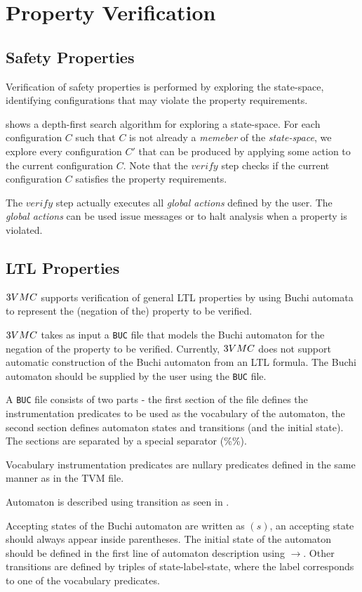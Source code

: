 \section{Property Verification}

\subsection{Safety Properties}

Verification of safety properties is performed by exploring the
state-space, identifying configurations that may violate the
property requirements.

 shows a depth-first search algorithm for
exploring a state-space. For each configuration $C$ such that $C$
is not already a \emph{memeber} of the \emph{state-space}, we
explore every configuration $C'$ that can be produced by applying
some action to the current configuration $C$. Note that the
$verify$ step checks if the current configuration $C$ satisfies
the property requirements.



The $verify$ step actually executes all \emph{global actions}
defined by the user. The \emph{global actions} can be used issue
messages or to halt analysis when a property is violated.

\subsection{LTL Properties}

$\tvmc$ supports verification of general LTL properties by using
Buchi automata to represent the (negation of the) property to be
verified.

$\tvmc$ takes as input a \texttt{BUC} file that models the Buchi
automaton for the negation of the property to be verified.
Currently, $\tvmc$ does not support automatic construction of the
Buchi automaton from an LTL formula. The Buchi automaton should be
supplied by the user using the \texttt{BUC} file.

A \texttt{BUC} file consists of two parts - the first section of
the file defines the instrumentation predicates to be used as the
vocabulary of the automaton, the second section defines automaton
states and transitions (and the initial state). The sections are
separated by a special separator (\%\%).

Vocabulary instrumentation predicates are nullary predicates
defined in the same manner as in the TVM file.

Automaton is described using transition as seen in
.



Accepting states of the Buchi automaton are written as $(s)$, an
accepting state should always appear inside parentheses. The
initial state of the automaton should be defined in the first line
of automaton description using $\rightarrow$. Other transitions
are defined by triples of state-label-state, where the label
corresponds to one of the vocabulary predicates.

